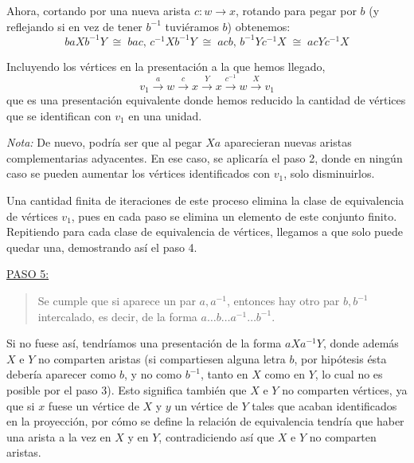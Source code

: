 {    \vspace{0.5em}
    \noindent
    Ahora, cortando por una nueva arista $c : w \to x$, rotando para pegar por $b$ 
    (y reflejando si en vez de tener $b^{-1}$ tuviéramos $b$) obtenemos:
    \[
        baXb^{-1}Y \;\cong\; bac \text{, } c^{-1}Xb^{-1}Y \;\cong\; acb \text{, } b^{-1}Yc^{-1}X \;\cong\; acYc^{-1}X
    \]

    \noindent
    Incluyendo los vértices en la presentación a la que hemos llegado, 
    \[
        v_1 \overset{a}{\to} w \overset{c}{\to} x \overset{Y}{\to} x \overset{c^{-1}}{\to} w \overset{X}{\to} v_1
    \]
    que es una presentación equivalente donde hemos reducido la cantidad de vértices que se identifican con $v_1$ en una unidad.

    \vspace{0.5em}
    \noindent
    \textit{Nota:} De nuevo, podría ser que al pegar $X a$ aparecieran nuevas aristas complementarias adyacentes. 
    En ese caso, se aplicaría el paso 2, donde en ningún caso se pueden aumentar los vértices identificados con $v_1$, solo disminuirlos.

    \vspace{0.5em}
    \noindent
    Una cantidad finita de iteraciones de este proceso elimina la clase de equivalencia de vértices $v_1$, 
    pues en cada paso se elimina un elemento de este conjunto finito. 
    Repitiendo para cada clase de equivalencia de vértices, llegamos a que solo puede quedar una, 
    demostrando así el paso 4.

    \vspace{1.3em}
    \noindent
    \underline{PASO 5:}
    \begin{quote}
        Se cumple que si aparece un par $a, a^{-1}$, entonces hay otro par $b, b^{-1}$ intercalado, 
        es decir, de la forma $a\dots b\dots a^{-1} \dots b^{-1}$.
    \end{quote}

    \noindent
    Si no fuese así, tendríamos una presentación de la forma $aXa^{-1}Y$, donde además $X$ e $Y$ no comparten aristas 
    (si compartiesen alguna letra $b$, por hipótesis ésta debería aparecer como $b$, y no como $b^{-1}$, tanto en $X$ como en $Y$, 
    lo cual no es posible por el paso 3). 
    Esto significa también que $X$ e $Y$ no comparten vértices, ya que si $x$ fuese un vértice de $X$ y $y$ un vértice de $Y$ tales que acaban identificados en la proyección,
    por cómo se define la relación de equivalencia tendría que haber una arista a la vez en $X$ y en $Y$, contradiciendo así que $X$ e $Y$ no comparten aristas.

}
